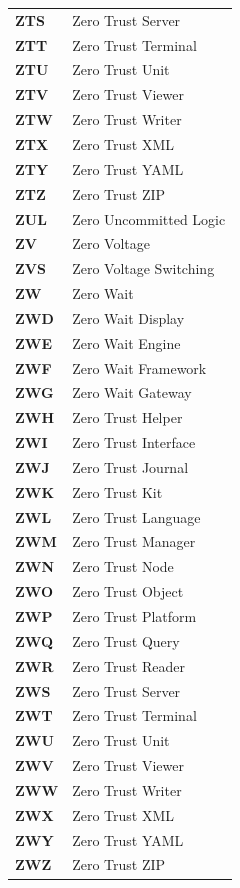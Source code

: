 \begin{longtable}{p{3cm}p{11cm}}
\textbf{ZTS} & Zero Trust Server \\
\textbf{ZTT} & Zero Trust Terminal \\
\textbf{ZTU} & Zero Trust Unit \\
\textbf{ZTV} & Zero Trust Viewer \\
\textbf{ZTW} & Zero Trust Writer \\
\textbf{ZTX} & Zero Trust XML \\
\textbf{ZTY} & Zero Trust YAML \\
\textbf{ZTZ} & Zero Trust ZIP \\
\textbf{ZUL} & Zero Uncommitted Logic \\
\textbf{ZV} & Zero Voltage \\
\textbf{ZVS} & Zero Voltage Switching \\
\textbf{ZW} & Zero Wait \\
\textbf{ZWD} & Zero Wait Display \\
\textbf{ZWE} & Zero Wait Engine \\
\textbf{ZWF} & Zero Wait Framework \\
\textbf{ZWG} & Zero Wait Gateway \\
\textbf{ZWH} & Zero Trust Helper \\
\textbf{ZWI} & Zero Trust Interface \\
\textbf{ZWJ} & Zero Trust Journal \\
\textbf{ZWK} & Zero Trust Kit \\
\textbf{ZWL} & Zero Trust Language \\
\textbf{ZWM} & Zero Trust Manager \\
\textbf{ZWN} & Zero Trust Node \\
\textbf{ZWO} & Zero Trust Object \\
\textbf{ZWP} & Zero Trust Platform \\
\textbf{ZWQ} & Zero Trust Query \\
\textbf{ZWR} & Zero Trust Reader \\
\textbf{ZWS} & Zero Trust Server \\
\textbf{ZWT} & Zero Trust Terminal \\
\textbf{ZWU} & Zero Trust Unit \\
\textbf{ZWV} & Zero Trust Viewer \\
\textbf{ZWW} & Zero Trust Writer \\
\textbf{ZWX} & Zero Trust XML \\
\textbf{ZWY} & Zero Trust YAML \\
\textbf{ZWZ} & Zero Trust ZIP \\

\end{longtable}
